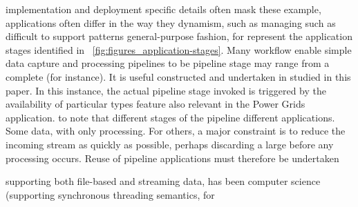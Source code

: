 \documentclass[times]{cpeauth}
\begin{document}
implementation and deployment specific details often mask these %
example, applications often differ in the way they %
dynamism, such as managing such as %
difficult to support patterns %
general-purpose fashion, for %
%
represent the application stages identified in %
\figurename~\ref{fig:figures_application-stages}.  Many workflow %
enable simple data capture and processing pipelines to be %
pipeline stage may range from a complete %
(for instance).  It is useful %
constructed and %
undertaken in %
studied in this paper. In this instance, the actual pipeline stage %
invoked is triggered by the availability of particular types %
feature also relevant in the Power Grids application.  %
to note that different stages of the pipeline %
different applications. Some %
data, with only %
processing. For others, a major constraint is to reduce the incoming %
stream as quickly as possible, perhaps discarding a large %
before any processing occurs. Reuse of pipeline %
applications must therefore be undertaken %

supporting both file-based and streaming data, has been %
computer science (supporting synchronous %
threading semantics, for %

\end{document}
